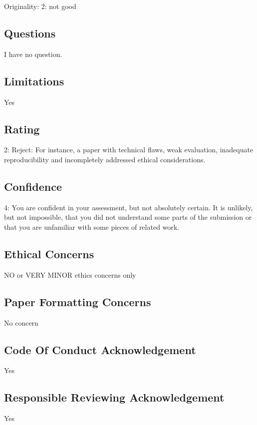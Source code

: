 \documentclass[11pt]{article}
\begin{document}
Originality: 2: not good

\subsection*{Questions}
I have no question.

\subsection*{Limitations}
Yes

\subsection*{Rating}
2: Reject: For instance, a paper with technical flaws, weak evaluation, inadequate reproducibility and incompletely addressed ethical considerations.

\subsection*{Confidence}
4: You are confident in your assessment, but not absolutely certain. It is unlikely, but not impossible, that you did not understand some parts of the submission or that you are unfamiliar with some pieces of related work.

\subsection*{Ethical Concerns}
NO or VERY MINOR ethics concerns only

\subsection*{Paper Formatting Concerns}
No concern

\subsection*{Code Of Conduct Acknowledgement}
Yes

\subsection*{Responsible Reviewing Acknowledgement}
Yes
\end{document}
